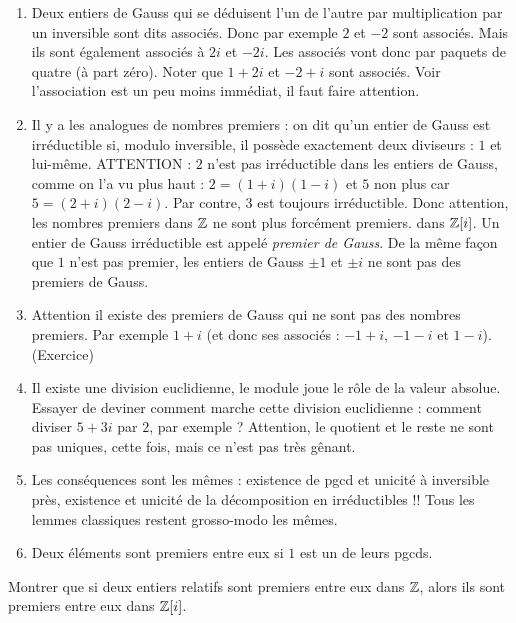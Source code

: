 \begin{enumerate}
\item Deux entiers de Gauss qui se déduisent l'un de l'autre par multiplication par un inversible sont dits associés. Donc par exemple $2$ et $-2$ sont associés. Mais ils sont également associés à $2i$ et $-2i$.  Les associés vont donc par paquets de quatre (à part zéro). Noter que $1+2i$ et $-2+i$ sont associés. Voir l'association est un peu moins immédiat, il faut faire attention.
\item Il y a les analogues de nombres premiers : on dit qu'un entier de Gauss est irréductible si, modulo inversible, il  possède exactement deux diviseurs : $1$ et lui-même. ATTENTION : $2$ n'est pas irréductible dans les entiers de Gauss, comme on l'a vu plus haut : $2=(1+i)(1-i)$ et $5$ non plus car $5=(2+i)(2-i)$. Par contre, $3$ est toujours irréductible. Donc attention, les nombres premiers dans $\mathbb Z$ ne sont plus forcément \og premiers\fg. dans $\mathbb Z[i]$. Un entier de Gauss irréductible est appelé \emph{premier de Gauss}.  De la même façon que $1$ n'est pas premier, les entiers de Gauss $\pm 1$ et $\pm i$ ne sont pas des premiers de Gauss.
\item Attention il existe des premiers de Gauss qui ne sont pas des nombres premiers. Par exemple $1+i$ (et donc ses associés : $-1+i$, $-1-i$ et $1-i$). (Exercice)
\item Il existe une division euclidienne, le module joue le rôle de la valeur absolue. Essayer de deviner comment marche cette division euclidienne : comment diviser $5+3i$ par $2$, par exemple ? Attention, le quotient et le reste ne sont pas uniques, cette fois, mais ce n'est pas très gênant.
\item Les conséquences sont les mêmes : existence de pgcd et unicité à inversible près, existence et unicité de la décomposition en irréductibles !! Tous les lemmes classiques restent grosso-modo les mêmes.
\item Deux éléments sont premiers entre eux si $1$ est un de leurs pgcds.
\end{enumerate}






\begin{exo}
Montrer que si deux entiers relatifs sont premiers entre eux dans $\mathbb Z$, alors ils sont premiers entre eux dans $\mathbb Z[i]$.
\end{exo}



